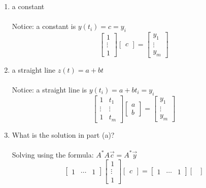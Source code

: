 \documentclass[12pt]{article}
\begin{document}
	\begin{enumerate}[label = (\alph*)]
		\item a constant \\ \\
		Notice: a constant is $y(t_i) = c = y_i$
		$$
		\begin{bmatrix}
			1 \\
			\vdots \\
			1
		\end{bmatrix}
		\begin{bmatrix}
			c
		\end{bmatrix}
		= 
		\begin{bmatrix}
			y_1 \\
			\vdots \\
			y_m
		\end{bmatrix}
		$$
		\item a straight line $z(t) = a + bt$ \\ \\
		Notice: a straight line is $y(t_i) = a + bt_i = y_i$
		$$
		\begin{bmatrix}
			1 & t_1 \\
			\vdots & \vdots \\
			1 & t_m
		\end{bmatrix}
		\begin{bmatrix}
			a \\
			b
		\end{bmatrix}
		=
		\begin{bmatrix}
			y_1 \\
			\vdots \\
			y_m
		\end{bmatrix}
		$$
		\item What is the solution in part (a)? \\ \\
		Solving using the formula: $A^*A\vec{c} = A^*\vec{y} $
		$$
		\begin{bmatrix}
		1 & \dotsb & 1
		\end{bmatrix}
		\begin{bmatrix}
		1 \\
		\vdots \\
		1
		\end{bmatrix}
		\begin{bmatrix}
		c
		\end{bmatrix}
		= 
		\begin{bmatrix}
		1 & \dotsb & 1	
		\end{bmatrix}
		\begin{bmatrix}

\end{bmatrix}$$
\end{enumerate}
\end{document}
